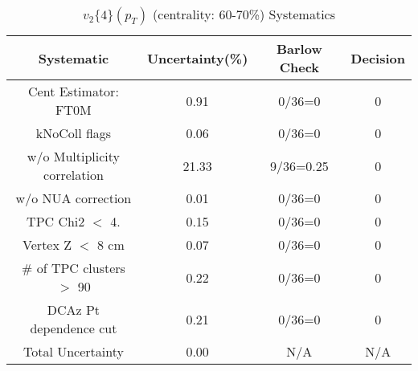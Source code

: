 \begin{table}[htbp]
\caption{$v_2\{4\}(p_{T})$ (centrality: 60-70\%) Systematics}
\label{tab:Sys_pTDiffv24ChFull}
\centering
\begin{tabular}{|c|c|c|c|}
\hline
Systematic & Uncertainty(\%) & Barlow Check & Decision \\
\hline
Cent Estimator: FT0M & 0.91 & 0/36=0 & 0 \\
kNoColl flags & 0.06 & 0/36=0 & 0 \\
w/o Multiplicity correlation & 21.33 & 9/36=0.25 & 0 \\
w/o NUA correction & 0.01 & 0/36=0 & 0 \\
TPC Chi2 $<$ 4. & 0.15 & 0/36=0 & 0 \\
Vertex Z $<$ 8 cm & 0.07 & 0/36=0 & 0 \\
\# of TPC clusters $>$ 90 & 0.22 & 0/36=0 & 0 \\
DCAz Pt dependence cut & 0.21 & 0/36=0 & 0 \\
\hline
Total Uncertainty & 0.00 & N/A & N/A \\
\hline
\end{tabular}
\end{table}
